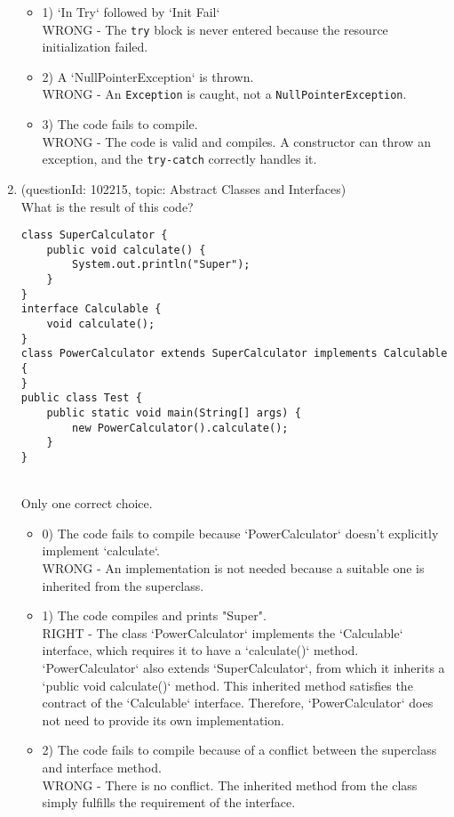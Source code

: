 \documentclass[12pt]{article}
\begin{document}
\begin{enumerate}[label=(\arabic*)]
\begin{itemize}
\item 1) `In Try` followed by `Init Fail`
 \\ 
WRONG - The \verb|try| block is never entered because the resource initialization failed.

\item 2) A `NullPointerException` is thrown.
 \\ 
WRONG - An \verb|Exception| is caught, not a \verb|NullPointerException|.

\item 3) The code fails to compile.
 \\ 
WRONG - The code is valid and compiles. A constructor can throw an exception, and the \verb|try-catch| correctly handles it.

\end{itemize}
\item (questionId: 102215, topic: Abstract Classes and Interfaces) \\ 
What is the result of this code?\n\begin{verbatim}
class SuperCalculator {
    public void calculate() {
        System.out.println("Super");
    }
}
interface Calculable {
    void calculate();
}
class PowerCalculator extends SuperCalculator implements Calculable {
}
public class Test {
    public static void main(String[] args) {
        new PowerCalculator().calculate();
    }
}
\end{verbatim}
\\ \noindent Only one correct choice. 
\begin{itemize}
\item 0) The code fails to compile because `PowerCalculator` doesn't explicitly implement `calculate`.
 \\ 
WRONG - An implementation is not needed because a suitable one is inherited from the superclass.

\item 1) The code compiles and prints "Super".
 \\ 
RIGHT - The class `PowerCalculator` implements the `Calculable` interface, which requires it to have a `calculate()` method. `PowerCalculator` also extends `SuperCalculator`, from which it inherits a `public void calculate()` method. This inherited method satisfies the contract of the `Calculable` interface. Therefore, `PowerCalculator` does not need to provide its own implementation.

\item 2) The code fails to compile because of a conflict between the superclass and interface method.
 \\ 
WRONG - There is no conflict. The inherited method from the class simply fulfills the requirement of the interface.


\end{itemize}
\end{enumerate}
\end{document}
